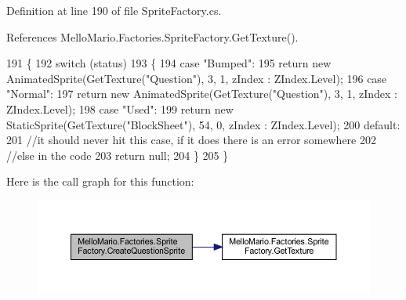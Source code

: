 Definition at line 190 of file Sprite\+Factory.\+cs.



References Mello\+Mario.\+Factories.\+Sprite\+Factory.\+Get\+Texture().


\begin{DoxyCode}
191         \{
192             \textcolor{keywordflow}{switch} (status)
193             \{
194                 \textcolor{keywordflow}{case} \textcolor{stringliteral}{"Bumped"}:
195                     \textcolor{keywordflow}{return} \textcolor{keyword}{new} AnimatedSprite(GetTexture(\textcolor{stringliteral}{"Question"}), 3, 1, zIndex : 
      ZIndex.Level);
196                 \textcolor{keywordflow}{case} \textcolor{stringliteral}{"Normal"}:
197                     \textcolor{keywordflow}{return} \textcolor{keyword}{new} AnimatedSprite(GetTexture(\textcolor{stringliteral}{"Question"}), 3, 1, zIndex : 
      ZIndex.Level);
198                 \textcolor{keywordflow}{case} \textcolor{stringliteral}{"Used"}:
199                     \textcolor{keywordflow}{return} \textcolor{keyword}{new} StaticSprite(GetTexture(\textcolor{stringliteral}{"BlockSheet"}), 54, 0, zIndex : 
      ZIndex.Level);
200                 \textcolor{keywordflow}{default}:
201                     \textcolor{comment}{//it should never hit this case, if it does there is an error somewhere}
202                     \textcolor{comment}{//else in the code}
203                     \textcolor{keywordflow}{return} null;
204             \}
205         \}
\end{DoxyCode}
Here is the call graph for this function\+:
\nopagebreak
\begin{figure}[H]
\begin{center}
\leavevmode
\includegraphics[width=350pt]{classMelloMario_1_1Factories_1_1SpriteFactory_a02466d3194ffe50ff66dba1069db447a_cgraph}
\end{center}
\end{figure}
\mbox{\label{classMelloMario_1_1Factories_1_1SpriteFactory_a778377c0e6784f9279f14bdbd08c115c}} 
